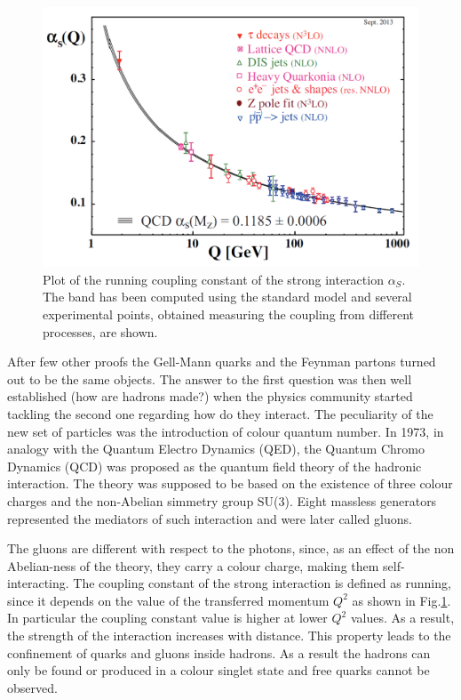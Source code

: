 \begin{figure}[!t]
\begin{center}
\includegraphics[width=0.85\linewidth]{Chapters/Introduction/Figs/QCD-running-coupling.pdf}
\caption{Plot of the running coupling constant of the strong interaction $\alpha_S$. The band has been computed using the standard model and several experimental points, obtained measuring the coupling from different processes, are shown.}
\label{fig:running}
\end{center}
\end{figure}

After few other proofs the Gell-Mann quarks and the Feynman partons turned out to be the same objects.
The answer to the first question was then well established (how are hadrons made?) when the physics community started tackling the second one regarding how do they interact.
The peculiarity of the new set of particles was the introduction of colour quantum number.
In 1973, in analogy with the Quantum Electro Dynamics (QED), the Quantum Chromo Dynamics (QCD) was proposed as the quantum field theory of the hadronic interaction.
The theory was supposed to be based on the existence of three colour charges and the non-Abelian simmetry group SU(3).
Eight massless generators represented the mediators of such interaction and were later called gluons.

The gluons are different with respect to the photons, since, as an effect of the non Abelian-ness of the theory, they carry a colour charge, making them self-interacting.
The coupling constant of the strong interaction is defined as running, since it depends on the value of the transferred momentum $Q^2$ as shown in Fig.\ref{fig:running}.
In particular the coupling constant value is higher at lower $Q^2$ values.
As a result, the strength of the interaction increases with distance.
This property leads to the confinement of quarks and gluons inside hadrons.
As a result the hadrons can only be found or produced in a colour singlet state and free quarks cannot be observed.

